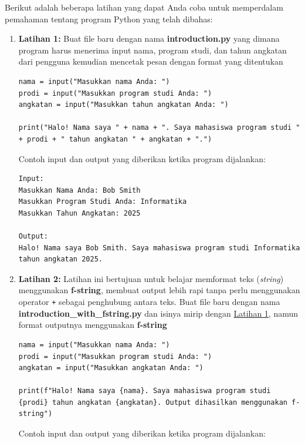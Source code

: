Berikut adalah beberapa latihan yang dapat Anda coba untuk memperdalam pemahaman tentang program Python yang telah dibahas:

\begin{enumerate}
\item \label{sec:first-exercise} \textbf{Latihan 1:} Buat file baru dengan nama \textbf{introduction.py} yang dimana program harus menerima input nama, program studi, dan tahun angkatan dari pengguna kemudian mencetak pesan dengan format yang ditentukan
\begin{lstlisting}[style=PythonStyle, caption={Latihan 1}]
nama = input("Masukkan nama Anda: ")
prodi = input("Masukkan program studi Anda: ")
angkatan = input("Masukkan tahun angkatan Anda: ")

print("Halo! Nama saya " + nama + ". Saya mahasiswa program studi " + prodi + " tahun angkatan " + angkatan + ".")
\end{lstlisting}

Contoh input dan output yang diberikan ketika program dijalankan:

\begin{verbatim}
Input:
Masukkan Nama Anda: Bob Smith
Masukkan Program Studi Anda: Informatika
Masukkan Tahun Angkatan: 2025

Output:
Halo! Nama saya Bob Smith. Saya mahasiswa program studi Informatika tahun angkatan 2025.
\end{verbatim}

\item \textbf{Latihan 2:} Latihan ini bertujuan untuk belajar memformat teks (\textit{string}) menggunakan \textbf{f-string}, membuat output lebih rapi tanpa perlu menggunakan operator \texttt{+} sebagai penghubung antara teks. Buat file baru dengan nama \textbf{introduction_with_fstring.py} dan isinya mirip dengan \hyperref[sec:first-exercise]{Latihan 1}, namun format outputnya menggunakan \textbf{f-string}

\begin{lstlisting}[style=PythonStyle, caption={Latihan 2}]
nama = input("Masukkan nama Anda: ")
prodi = input("Masukkan program studi Anda: ")
angkatan = input("Masukkan angkatan Anda: ")

print(f"Halo! Nama saya {nama}. Saya mahasiswa program studi {prodi} tahun angkatan {angkatan}. Output dihasilkan menggunakan f-string")
\end{lstlisting}

Contoh input dan output yang diberikan ketika program dijalankan:


\end{enumerate}
